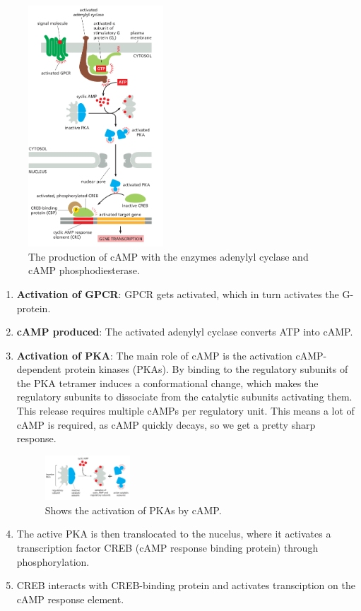 \documentclass[../main.tex]{subfiles}
\begin{document}
\begin{figure}[H]
	\centering
	\includegraphics[width=0.45\textwidth]{cAMP_path}
	\caption{The production of cAMP with the enzymes adenylyl cyclase and cAMP phosphodiesterase.}
\end{figure}


\begin{enumerate}
	\item \textbf{Activation of GPCR}: GPCR gets activated, which in turn activates the G-protein.
	\item \textbf{cAMP produced}: The activated adenylyl cyclase converts ATP into cAMP.
	\item \textbf{ Activation of PKA}: The main role of cAMP is the activation cAMP-dependent protein kinases (PKAs). By binding to the regulatory subunits of the PKA tetramer induces a conformational change, which makes the regulatory subunits to dissociate from the catalytic subunits activating them. This release requires multiple cAMPs per regulatory unit. This means a lot of cAMP is required, as cAMP quickly decays, so we get a pretty sharp response.
	\begin{figure}[H]
		\centering
		\includegraphics[width=0.3\textwidth]{cAMP_PKA}
		\caption{Shows the activation of PKAs by cAMP.}
	\end{figure}
	\item The active PKA is then translocated to the nucelus, where it activates a transcription factor CREB (cAMP response binding protein) through phosphorylation.
	\item CREB interacts with CREB-binding protein and activates transciption on the cAMP response element.
\end{enumerate}
\end{document}
